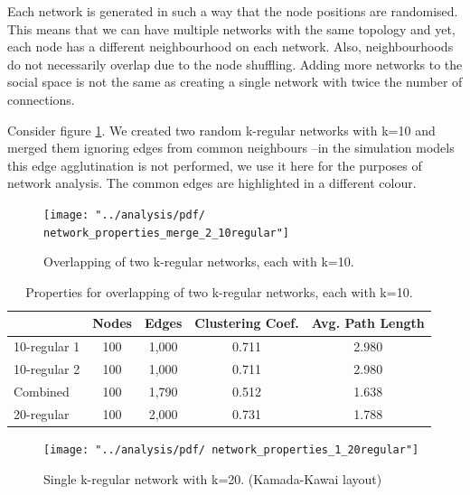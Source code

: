 \documentclass[preprint,number]{elsarticle}
\begin{document}
Each network is generated in such a way that the node positions are randomised. This means that we can have multiple networks with the same topology and yet, each node has a different neighbourhood on each network. Also, neighbourhoods do not necessarily overlap due to the node shuffling. Adding more networks to the social space is not the same as creating a single network with twice the number of connections. 

\noindent Consider figure \ref{fig:network_properties_merge_2_10regular}. We created two random k-regular networks with k=10 and merged them ignoring edges from common neighbours --in the simulation models this edge agglutination is not performed, we use it here for the purposes of network analysis. The common edges are highlighted in a different colour.

\begin{figure}
	\centering
	\texttt{[image: "../analysis/pdf/ network\_properties\_merge\_2\_10regular"]}
	\begin{minipage}{0.9\textwidth}
		\caption{Overlapping of two k-regular networks, each with k=10.}
		\label{fig:network_properties_merge_2_10regular}
	\end{minipage}
\end{figure}

\begin{table}
	\centering
	\begin{minipage}{0.9\textwidth}
		\caption{Properties for overlapping of two k-regular networks, each with k=10.}
		\label{tab:network_properties_merge_2_10regular}
	\end{minipage}
	\begin{tabular}{lcccc}
		& Nodes &  Edges & Clustering Coef.	  &  Avg. Path Length \\ 
		\hline  10-regular 1 & 100 &  1,000  &  0.711 &  2.980 \\ 
		\hline  10-regular 2 & 100 & 1,000 & 0.711 &  2.980 \\ 
		\hline  Combined & 100 & 1,790  & 0.512 &  1.638 \\ 
		\hline 20-regular & 100 & 2,000	& 0.731	& 1.788 \\
		\hline 
	\end{tabular} 
\end{table}

\begin{figure}
	\texttt{[image: "../analysis/pdf/ network\_properties\_1\_20regular"]}
	\begin{minipage}{0.7\linewidth}
		\caption{Single k-regular network with k=20. (Kamada-Kawai layout)}
		\label{fig:network_properties_1_20regular}
	\end{minipage}
\end{figure}
\end{document}
